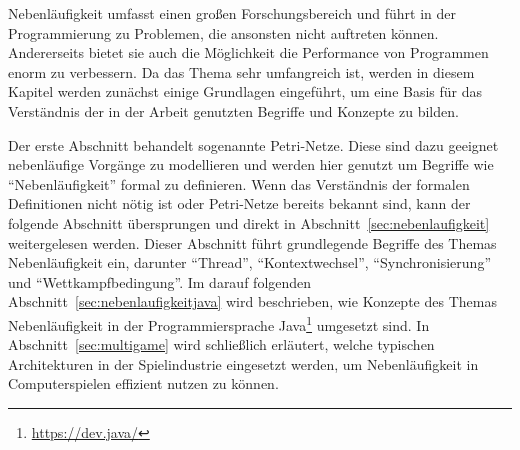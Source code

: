 Nebenläufigkeit umfasst einen großen Forschungsbereich und führt in der Programmierung zu Problemen, die ansonsten nicht auftreten können. Andererseits bietet sie auch die Möglichkeit die Performance von Programmen enorm zu verbessern. Da das Thema sehr umfangreich ist, werden in diesem Kapitel werden zunächst einige Grundlagen eingeführt, um eine Basis für das Verständnis der in der Arbeit genutzten Begriffe und Konzepte zu bilden. 

Der erste Abschnitt behandelt sogenannte Petri-Netze. Diese sind dazu geeignet nebenläufige Vorgänge zu modellieren und werden hier genutzt um Begriffe wie \enquote{Nebenläufigkeit} formal zu definieren. Wenn das Verständnis der formalen Definitionen nicht nötig ist oder Petri-Netze bereits bekannt sind, kann der folgende Abschnitt übersprungen und direkt in Abschnitt~\ref{sec:nebenlaufigkeit} weitergelesen werden. Dieser Abschnitt führt grundlegende Begriffe des Themas Nebenläufigkeit ein, darunter \enquote{Thread}, \enquote{Kontextwechsel}, \enquote{Synchronisierung} und \enquote{Wettkampfbedingung}. Im darauf folgenden Abschnitt~\ref{sec:nebenlaufigkeitjava} wird beschrieben, wie Konzepte des Themas Nebenläufigkeit in der Programmiersprache Java\footnote{\url{https://dev.java/}} umgesetzt sind. In Abschnitt~\ref{sec:multigame} wird schließlich erläutert, welche typischen Architekturen in der Spielindustrie eingesetzt werden, um Nebenläufigkeit in Computerspielen effizient nutzen zu können.